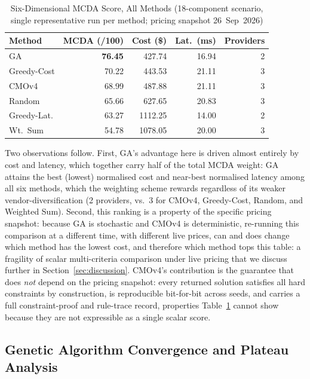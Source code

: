 \documentclass[journal]{IEEEtran}
\newcommand{\cmofour}{CMOv4\xspace}
\begin{document}
\begin{table}[t]
\centering
\caption{Six-Dimensional MCDA Score, All Methods (18-component scenario,
single representative run per method; pricing snapshot 26~Sep~2026)}
\label{tab:mcda-baselines}
\begin{tabular}{@{}lrrrr@{}}
\toprule
Method        & MCDA (/100) & Cost (\$) & Lat.\ (ms) & Providers \\
\midrule
GA            & \textbf{76.45} & 427.74  & 16.94 & 2 \\
Greedy-Cost   & 70.22          & 443.53  & 21.11 & 3 \\
\cmofour      & 68.99          & 487.88  & 21.11 & 3 \\
Random        & 65.66          & 627.65  & 20.83 & 3 \\
Greedy-Lat.   & 63.27          & 1112.25 & 14.00 & 2 \\
Wt.\ Sum      & 54.78          & 1078.05 & 20.00 & 3 \\
\bottomrule
\end{tabular}
\end{table}

Two observations follow. First, GA's advantage here is driven almost entirely
by cost and latency, which together carry half of the total MCDA weight: GA
attains the best (lowest) normalised cost and near-best normalised latency
among all six methods, which the weighting scheme rewards regardless of its
weaker vendor-diversification (2 providers, vs.\ 3 for \cmofour, Greedy-Cost,
Random, and Weighted Sum). Second, this ranking is a property of the specific
pricing snapshot: because GA is stochastic and \cmofour is deterministic,
re-running this comparison at a different time, with different live prices,
can and does change which method has the lowest cost, and therefore which
method tops this table: a fragility of scalar multi-criteria comparison
under live pricing that we discuss further in
Section~\ref{sec:discussion}. \cmofour's contribution is the guarantee that
does \emph{not} depend on the pricing snapshot: every returned solution
satisfies all hard constraints by construction, is reproducible bit-for-bit
across seeds, and carries a full constraint-proof and rule-trace record,
properties Table~\ref{tab:mcda-baselines} cannot show because they are not
expressible as a single scalar score.

\subsection{Genetic Algorithm Convergence and Plateau Analysis}
\label{sec:gaconverge}
\end{document}
